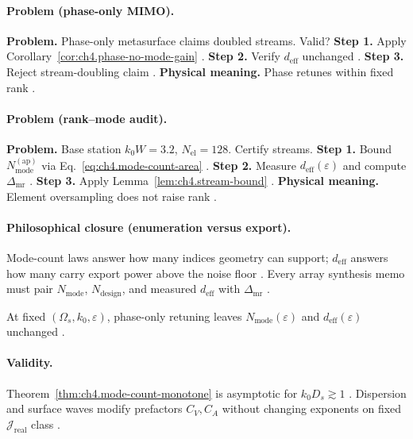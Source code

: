 \paragraph{Problem (phase-only MIMO).}
\textbf{Problem.} Phase-only metasurface claims doubled streams. Valid?
\textbf{Step 1.} Apply Corollary~\ref{cor:ch4.phase-no-mode-gain} \cite{devaney2004,harrington2001}.
\textbf{Step 2.} Verify \(d_{\mathrm{eff}}\) unchanged \cite{hansen1988,stratton1941}.
\textbf{Step 3.} Reject stream-doubling claim \cite{collin2001}.
\textbf{Physical meaning.} Phase retunes within fixed rank \cite{harrington2001}.

\paragraph{Problem (rank--mode audit).}
\textbf{Problem.} Base station \(k_{0}W=3.2\), \(N_{\mathrm{el}}=128\). Certify streams.
\textbf{Step 1.} Bound \(N_{\mathrm{mode}}^{\mathrm{(ap)}}\) via Eq.~\eqref{eq:ch4.mode-count-area} \cite{jackson1999,hansen1988}.
\textbf{Step 2.} Measure \(d_{\mathrm{eff}}(\varepsilon)\) and compute \(\Delta_{\mathrm{mr}}\) \cite{harrington2001,devaney2004}.
\textbf{Step 3.} Apply Lemma~\ref{lem:ch4.stream-bound} \cite{collin2001,stratton1941}.
\textbf{Physical meaning.} Element oversampling does not raise rank \cite{hansen1988}.

\paragraph{Philosophical closure (enumeration versus export).}
Mode-count laws answer how many indices geometry can support; \(d_{\mathrm{eff}}\) answers how many carry export power above the noise floor
\cite{hansen1988,stratton1941,harrington2001,devaney2004}. Every array synthesis memo must pair \(N_{\mathrm{mode}}\), \(N_{\mathrm{design}}\), and measured
\(d_{\mathrm{eff}}\) with \(\Delta_{\mathrm{mr}}\) \cite{collin2001,stratton1941}.

\begin{corollary}
\label{cor:ch4.phase-no-mode-gain}
At fixed \((\Omega_{s},k_{0},\varepsilon)\), phase-only retuning leaves \(N_{\mathrm{mode}}(\varepsilon)\) and \(d_{\mathrm{eff}}(\varepsilon)\) unchanged
\cite{devaney2004,harrington2001,stratton1941,hansen1988}.
\end{corollary}

\paragraph{Validity.}
Theorem~\ref{thm:ch4.mode-count-monotone} is asymptotic for \(k_{0}D_{s}\gtrsim1\) \cite{jackson1999,hansen1988}. Dispersion and surface waves modify
prefactors \(C_{V},C_{A}\) without changing exponents on fixed \(\mathcal{J}_{\mathrm{real}}\) class \cite{stratton1941,harrington2001,devaney2004,collin2001}.
